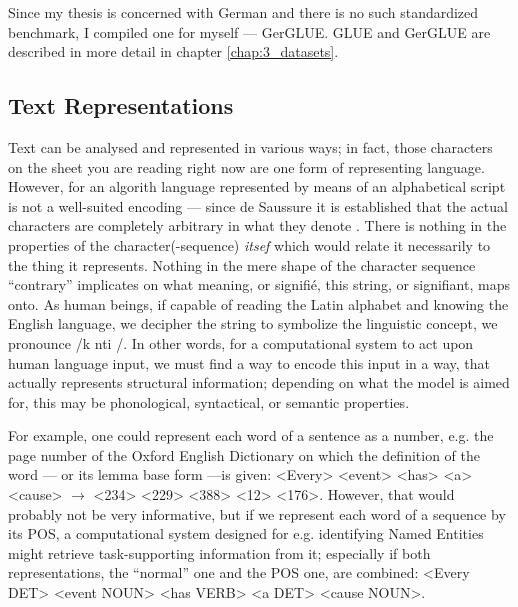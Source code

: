 Since my thesis is concerned with German and there is no such standardized benchmark, I
compiled one for myself --- GerGLUE. GLUE and GerGLUE are described in more detail in
chapter \ref{chap:3_datasets}.


\subsection{Text Representations}

Text can be analysed and represented in various ways; in fact, those characters on the
sheet you are reading right now are one form of representing language. However, for an
algorith language represented by means of an alphabetical script is not a well-suited
encoding --- since de Saussure it is established that the actual characters are completely
arbitrary in what they denote \citep{de1989cours}. There is nothing in the properties of
the character(-sequence) \emph{itsef} which would relate it necessarily to the thing it
represents. Nothing in the mere shape of the character sequence ``contrary'' implicates
on what meaning, or signifié, this string, or signifiant, maps onto. As human beings, if
capable of reading the Latin alphabet and knowing the English language, we decipher the
string to symbolize the linguistic concept, we pronounce /\textprimstress k\textscripta
nt\textturnr \textschwa \textturnr i /. In other words, for a computational system to act
upon human language input, we must find a way to encode this input in a way, that actually
represents structural information; depending on what the model is aimed for, this may be
phonological, syntactical, or semantic properties.

For example, one could represent each word of a sentence as a number, e.g. the page number of the
Oxford English Dictionary on which the definition of the word --- or its lemma base form ---is
given: <Every> <event> <has> <a> <cause> $\rightarrow$ <234> <229> <388> <12> <176>. However, that
would probably not be very informative, but if we represent each word of a sequence by its POS, a
computational system designed for e.g. identifying Named Entities might retrieve task-supporting
information from it; especially if both representations, the ``normal'' one and the POS one, are
combined: <Every DET> <event NOUN> <has VERB> <a DET> <cause NOUN>.


